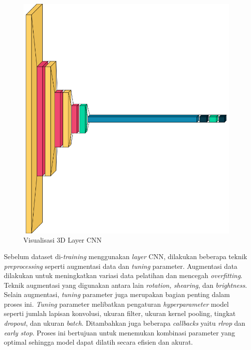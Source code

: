 \begin{figure} [ht] \centering
  \includegraphics[scale=0.25]{gambar/bab3/3dlayer.png}
  \caption{Visualisasi 3D Layer CNN}
  \label{fig:3dlayercnn}
\end{figure}

Sebelum dataset di-\emph{training} menggunakan \emph{layer} CNN, dilakukan beberapa teknik \emph{preprocessing} seperti augmentasi data dan \emph{tuning} parameter. Augmentasi data dilakukan untuk meningkatkan variasi data pelatihan dan mencegah \emph{overfitting}. Teknik augmentasi yang digunakan antara lain \emph{rotation, shearing}, dan \emph{brightness}. Selain augmentasi, \emph{tuning} parameter juga merupakan bagian penting dalam proses ini. \emph{Tuning} parameter melibatkan pengaturan \emph{hyperparameter} model seperti jumlah lapisan konvolusi, ukuran filter, ukuran kernel pooling, tingkat \emph{dropout}, dan ukuran \emph{batch}. Ditambahkan juga beberapa \emph{callbacks} yaitu \emph{rlrop} dan \emph{early stop}. Proses ini bertujuan untuk menemukan kombinasi parameter yang optimal sehingga model dapat dilatih secara efisien dan akurat.

